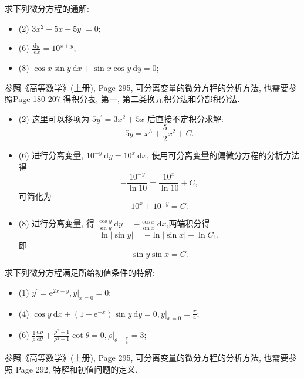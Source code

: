 \documentclass[answer]{THUExam}
\begin{document}
\begin{problem}
求下列微分方程的通解:
\begin{itemize}
    \item (2) $3 x^2+5 x-5 y^{\prime}=0$;
    \item (6) $\frac{\mathrm{d} y}{\mathrm{~d} x}=10^{x+y}$;
    \item (8) $\cos x \sin y \mathrm{~d} x+\sin x \cos y \mathrm{~d} y=0$;
\end{itemize}
\end{problem}
\begin{note}
    参照《高等数学》(上册), Page 295, 可分离变量的微分方程的分析方法, 也需要参照Page 180-207 得积分表, 第一, 第二类换元积分法和分部积分法.
\end{note}
\begin{solution}
    \begin{itemize}
        \item (2) 这里可以移项为 $5 y^{\prime}=3 x^2+5 x$ 后直接不定积分求解:
              $$
                  5 y=x^3+\frac{5}{2} x^2+C.
              $$
        \item (6) 进行分离变量,  $10^{-y} \mathrm{~d} y=10^x \mathrm{~d} x$, 使用可分离变量的偏微分方程的分析方法得
              $$
                  -\frac{10^{-y}}{\ln 10}=\frac{10^x}{\ln 10}+C,
              $$
              可简化为
              $$
                  10^x+10^{-y}=C.
              $$
        \item (8) 进行分离变量, 得 $\frac{\cos y}{\sin y} \mathrm{~d} y=-\frac{\cos x}{\sin x} \mathrm{~d} x$,两端积分得
              $$
                  \ln |\sin y|=-\ln |\sin x|+\ln C_1,
              $$
              即
              $$
                  \sin y\sin x=C.
              $$
    \end{itemize}
\end{solution}


\begin{problem}
求下列微分方程满足所给初值条件的特解:
\begin{itemize}
    \item (1) $y^{\prime}=\mathrm{e}^{2 x-y},\left.y\right|_{x=0}=0$;
    \item (4) $\cos y \mathrm{~d} x+\left(1+\mathrm{e}^{-x}\right) \sin y \mathrm{~d} y=0,\left.y\right|_{x=0}=\frac{\pi}{4}$;
    \item (6) $\frac{1}{\rho} \frac{\mathrm{d} \rho}{\mathrm{d} \theta}+\frac{\rho^2+1}{\rho^2-1} \cot \theta=0,\left.\rho\right|_{\theta=\frac{\pi}{6}}=3$;
\end{itemize}
\end{problem}
\begin{note}
    参照《高等数学》(上册), Page 295, 可分离变量的微分方程的分析方法, 也需要参照 Page 292, 特解和初值问题的定义.
\end{note}
\end{document}
